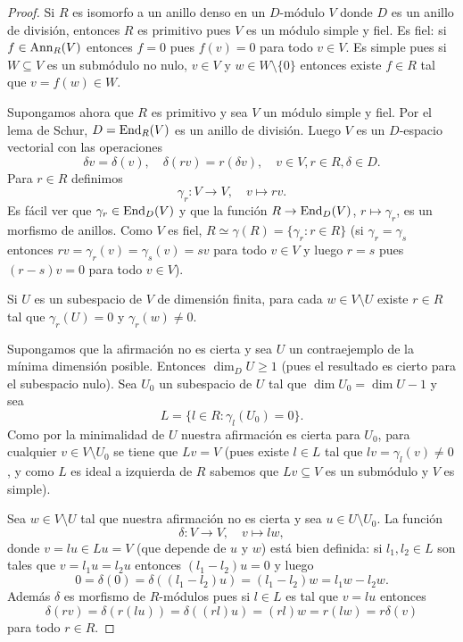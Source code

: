 \begin{proof}
	Si $R$ es isomorfo a un anillo
	denso en un $D$-módulo $V$ donde $D$ es un anillo de división, entonces $R$
	es primitivo pues $V$ es un módulo simple y fiel. Es fiel: si
	$f\in\operatorname{Ann}_R(V)$ entonces $f=0$ pues $f(v)=0$ para todo $v\in V$. Es simple
	pues si $W\subseteq V$ es un submódulo no nulo, $v\in V$ y $w\in
	W\setminus\{0\}$ entonces existe $f\in R$ tal que $v=f(w)\in W$. 

	Supongamos ahora que $R$ es primitivo y sea $V$ un módulo simple y fiel.
	Por el lema de Schur, $D=\operatorname{End}_R(V)$ es un anillo de división. Luego $V$ es
	un $D$-espacio vectorial con las operaciones
	\[
	\delta v=\delta(v),\quad
	\delta(rv)=r(\delta v),\quad
	v\in V,r\in R,\delta\in D.
	\]
	Para $r\in R$ definimos 
	\[
		\gamma_r\colon V\to V,\quad
		v\mapsto rv.
	\]
	Es fácil ver que $\gamma_r\in\operatorname{End}_D(V)$ y que la función $R\to\operatorname{End}_D(V)$,
	$r\mapsto\gamma_r$, es un morfismo de anillos. Como $V$ es fiel,
	$R\simeq\gamma(R)=\{\gamma_r:r\in R\}$ (si $\gamma_r=\gamma_s$ entonces
	$rv=\gamma_r(v)=\gamma_s(v)=sv$ para todo $v\in V$ y luego $r=s$ pues
	$(r-s)v=0$ para todo $v\in V$).

	\begin{claim}
		Si $U$ es un subespacio de $V$
		de dimensión finita, para cada $w\in V\setminus U$ existe $r\in R$ tal que
		$\gamma_r(U)=0$ y $\gamma_r(w)\ne0$.
	\end{claim}

	Supongamos que la afirmación no es cierta y sea $U$ un contraejemplo de la
	mínima dimensión posible. Entonces $\dim_DU\geq1$ (pues el resultado es
	cierto para el subespacio nulo). Sea $U_0$ un subespacio de $U$ tal que
	$\dim U_0=\dim U-1$ y sea
	\[
		L=\{l\in R:\gamma_l(U_0)=0\}.
	\]
	Como por la minimalidad de $U$ nuestra afirmación es cierta para $U_0$,
	para cualquier $v\in V\setminus U_0$ se tiene que $Lv=V$ (pues existe $l\in
	L$ tal que $lv=\gamma_l(v)\ne 0$, y como $L$ es ideal a izquierda de $R$ sabemos
	que $Lv\subseteq V$ es un submódulo y $V$ es simple).

	Sea $w\in V\setminus U$ tal que nuestra afirmación no es cierta y sea $u\in
	U\setminus U_0$.  La función 
	\[
		\delta\colon V\to V,\quad
		v\mapsto lw,
	\]
	donde $v=lu\in Lu=V$ (que depende de $u$ y $w$) 
	está bien definida: si $l_1,l_2\in L$ son tales que $v=l_1u=l_2u$ entonces $(l_1-l_2)u=0$ y luego
	\[
		0=\delta(0)=\delta((l_1-l_2)u)=(l_1-l_2)w=l_1w-l_2w. 
	\]
	Además $\delta$ es morfismo de $R$-módulos pues si $l\in L$ es tal que $v=lu$ entonces
	\[
		\delta(rv)=\delta(r(lu))=\delta( (rl)u)=(rl)w=r(lw)=r\delta(v)
	\]
	para todo $r\in R$.


\end{proof}

